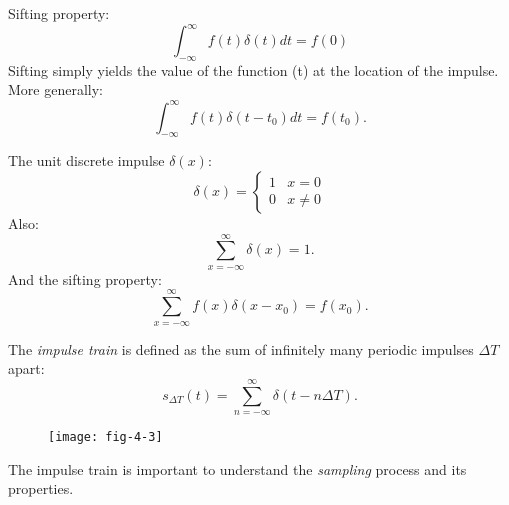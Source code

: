 
\begin{frame}
Sifting property:
\begin{equation}
\int_{-\infty}^{\infty} f(t)\delta(t) dt = f(0)
\end{equation}
Sifting simply yields the value of the function (t) at the location of the impulse.\\
More generally:
\begin{equation}
\boxed{\int_{-\infty}^{\infty} f(t) \delta(t-t_{0}) dt = f(t_{0})}.
\end{equation}
\end{frame}


\begin{frame}
The unit discrete impulse $\delta(x)$:
\begin{equation}
\delta(x) = \left \{
\begin{array}{ll}
1 & x=0\\
0 & x\neq 0
\end{array}
\right .
\end{equation}
Also:
\begin{equation}
\sum_{x=-\infty}^{\infty} \delta(x) = 1.
\end{equation}
And the sifting property:
\begin{equation}
\sum_{x=-\infty}^{\infty}f(x) \delta(x-x_{0}) = f(x_{0}).
\end{equation}
\end{frame}


\begin{frame}
The \textit{impulse train} is defined as the sum of infinitely many periodic impulses $\Delta T$ apart:
\begin{equation}
s_{\Delta T}(t) = \sum_{n=-\infty}^{\infty}\delta(t-n\Delta T).
\end{equation}
\begin{figure}
\centering
\texttt{[image: fig-4-3]}
\end{figure}
The impulse train is important to understand the \textit{sampling} process and its properties.
\end{frame}


